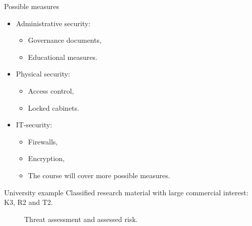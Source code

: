 \documentclass{beamer}
\begin{document}
\begin{frame}{Possible measures}
  \begin{itemize}
    \item Administrative security:
      \begin{itemize}
        \item Governance documents,
        \item Educational measures.
      \end{itemize}
    \item Physical security:
      \begin{itemize}
        \item Access control,
        \item Locked cabinets.
      \end{itemize}
    \item IT-security:
      \begin{itemize}
        \item Firewalls,
        \item Encryption,
        \item The course will cover more possible measures.
      \end{itemize}
  \end{itemize}
\end{frame}

\begin{frame}{University example}
  Classified research material with large commercial interest: K3, R2 and T2.
  \begin{figure}
    \hfill
    \hfill
    \hfill
    \caption{Threat assessment and assessed risk.}
  \end{figure}
\end{frame}
\end{document}
